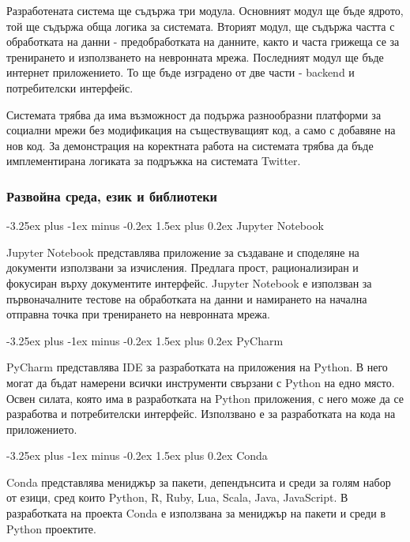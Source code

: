 \documentclass{article}
\makeatletter
\newcounter{subsubsubsection}[subsubsection]
\renewcommand\paragraph{\@startsection{paragraph}{5}{\z@}%
{3.25ex \@plus1ex \@minus.2ex}%
{-1em}%
{\normalfont\normalsize\bfseries}}
\renewcommand{\paragraph}{\@startsection{paragraph}{4}{0ex}%
{-3.25ex plus -1ex minus -0.2ex}%
{1.5ex plus 0.2ex}%
{\normalfont\normalsize\bfseries}}
\makeatother
\begin{document}
    Разработената система ще съдържа три модула. Основният модул ще бъде ядрото, той ще съдържа обща логика за системата.
    Вторият модул, ще съдържа частта с обработката на данни - предобработката на данните, както и часта грижеща се за
    тренирането и използването на невронната мрежа. Последният модул ще бъде интернет приложението. То ще бъде изградено от
    две части - backend и потребителски интерфейс.

    Системата трябва да има възможност да подържа разнообразни платформи за социални мрежи без модификация на
    съществуващият код, а само с добавяне на нов код. За демонстрация на коректната работа на системата трябва да бъде
    имплементирана логиката за подръжка на системата Twitter.

    \subsubsection{Развойна среда, език и библиотеки}


    \paragraph{Jupyter Notebook}

    Jupyter Notebook представлява приложение за създаване и споделяне на документи използвани за изчисления. Предлага прост,
    рационализиран и фокусиран върху документите интерфейс. \cite{jupyter} Jupyter Notebook е използван за първоначалните
    тестове на обработката на данни и намирането на начална отправна точка при тренирането на невронната мрежа.

    \paragraph{PyCharm}

    PyCharm представлява IDE за разработката на приложения на Python. В него могат да бъдат намерени всички инструменти
    свързани с Python на едно място. Освен силата, която има в разработката на Python приложения, с него може да се
    разработва и потребителски интерфейс. \cite{pycharm} Използвано е за разработката на кода на приложението.

    \paragraph{Conda}

    Conda представлява мениджър за пакети, депендънсита и среди за голям набор от езици, сред които Python, R, Ruby, Lua,
    Scala, Java, JavaScript. \cite{conda} В разработката на проекта Conda е използвана за мениджър на пакети и среди в
    Python проектите.
\end{document}
